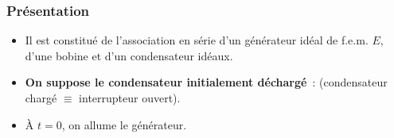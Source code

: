\documentclass[../../main/main.tex]{subfiles}
\begin{document}
\subsubsection{Présentation}
\begin{minipage}[c]{.6\linewidth}
	\begin{itemize}
		\item Il est constitué de l'association en série d'un générateur idéal de
          f.e.m. $E$, d'une bobine et d'un condensateur idéaux.
		\item \textbf{On suppose le condensateur initialement déchargé}~:
		       (condensateur chargé
		      $\equiv$ interrupteur ouvert).
		\item À $t=0$, on allume le générateur.
	\end{itemize}
\end{minipage}
\hfill
\begin{minipage}[c]{.35\linewidth}
	~
	\begin{center}
	\end{center}
\end{minipage}
\end{document}
